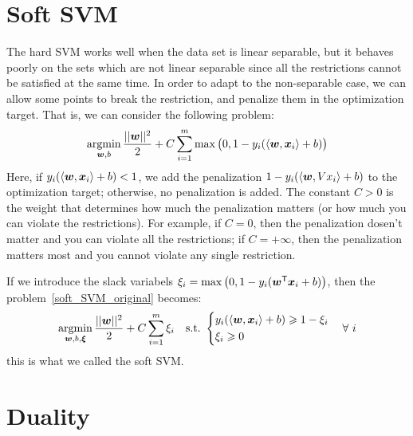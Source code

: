\section{Soft SVM}
The hard SVM works well when the data set is linear separable, but it behaves poorly on the sets which are not
linear separable since all the restrictions cannot be satisfied at the same time. In order to adapt to the 
non-separable case, we can allow some points to break the restriction, and penalize them in the optimization
target. That is, we can consider the following problem:
\begin{equation}\label{soft_SVM_original}
    \operatorname*{argmin}_{\boldsymbol{w}, b} \frac{||\boldsymbol{w}||^2}{2} + C\sum_{i=1}^{m}\max\big(0, 1 - y_i(\langle\boldsymbol{w}, \boldsymbol{x}_i\rangle
    + b)\big)
\end{equation}
Here, if $y_i(\langle\boldsymbol{w}, \boldsymbol{x}_i\rangle + b) < 1$, we add the penalization 
$1 - y_i(\langle\boldsymbol{w}, V{x}_i\rangle +b)$ to the 
optimization target; otherwise, no penalization is added. The constant $C > 0$ is the weight that determines 
how much the penalization matters (or how much you can violate the restrictions). For example, if $C = 0$, 
then the penalization dosen't matter and you can violate all the restrictions; if $C = +\infty$, then the 
penalization matters most and you cannot violate any single restriction.\par
If we introduce the slack variabels $\xi_i = \max\big(0, 1 - y_i({\boldsymbol{w}}^\mathsf{T}\boldsymbol{x}_i +b)\big)$, then
the problem~\eqref{soft_SVM_original} becomes:
\begin{equation}\label{soft_SVM}
    \operatorname*{argmin}_{\boldsymbol{w}, b, \boldsymbol{\xi}} \frac{||\boldsymbol{w}||^2}{2} + C\sum_{i=1}^{m}\xi_i\quad\text{s.t.\ }\left\{
    \begin{aligned}
    & y_i(\langle\boldsymbol{w}, \boldsymbol{x}_i\rangle + b) \geqslant 1 - \xi_i\\
    & \xi_i \geqslant 0 
    \end{aligned}\right.
    \quad\forall~i
\end{equation}
this is what we called the soft SVM\@.

\section{Duality}

